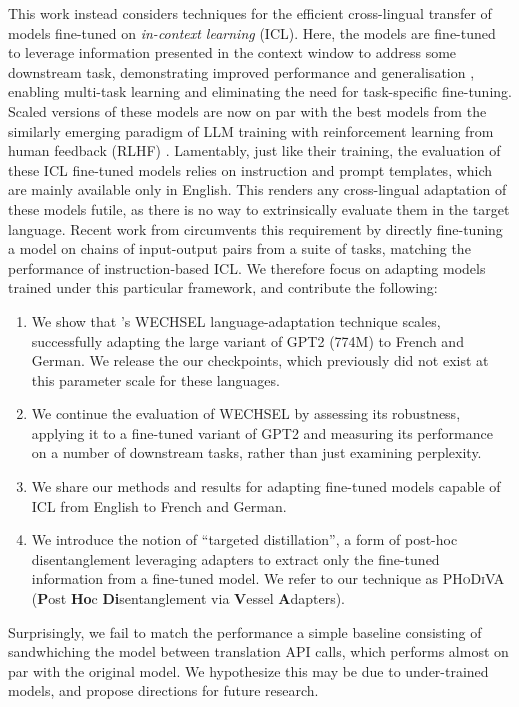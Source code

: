 \documentclass[11pt]{article}
\begin{document}
This work instead considers techniques for the efficient cross-lingual transfer of models fine-tuned
on \textit{in-context learning} (ICL). Here, the models are fine-tuned to leverage information
presented in the context window to address some downstream task, demonstrating improved performance
and generalisation \citep{wei_finetuned_2021,sanh_multitask_2022,wang_benchmarking_2022}, enabling
multi-task learning and eliminating the need for task-specific fine-tuning. Scaled versions of these
models \citep{chung_scaling_2022} are now on par with the best models from the similarly emerging
paradigm of LLM training with reinforcement learning from human feedback (RLHF)
\citep{ouyang_training_2022}. Lamentably, just like their training, the evaluation of these ICL
fine-tuned models relies on instruction and prompt templates, which are mainly available only in
English. This renders any cross-lingual adaptation of these models futile, as there is no way to
extrinsically evaluate them in the target language. Recent work from \citet{min_metaicl_2022}
circumvents this requirement by directly fine-tuning a model on chains of input-output pairs from
a suite of tasks, matching the performance of instruction-based ICL. We therefore focus on adapting
models trained under this particular framework, and contribute the following:
\begin{enumerate}
	\item We show that \citet{minixhofer_wechsel_2022}'s WECHSEL language-adaptation technique scales,
	      successfully adapting the large variant of GPT2 (774M) to French and German. We release the our
	      checkpoints, which previously did not exist at this parameter scale for these languages.
	\item We continue the evaluation of WECHSEL by assessing its robustness, applying it to
	      a fine-tuned variant of GPT2 and measuring its performance on a number of downstream tasks,
	      rather than just examining perplexity.
	\item We share our methods and results for adapting fine-tuned models capable of ICL from English to
	      French and German.
	\item We introduce the notion of ``targeted distillation'', a form of post-hoc disentanglement
	      leveraging adapters \citep{houlsby_parameter-efficient_2019} to extract only the fine-tuned
	      information from a fine-tuned model.  We refer to our technique as \textsc{PHoDiVA}
	      (\textbf{P}ost \textbf{Ho}c \textbf{Di}sentanglement via \textbf{V}essel \textbf{A}dapters).
\end{enumerate}
Surprisingly, we fail to match the performance a simple baseline consisting of sandwhiching the
model between translation API calls, which performs almost on par with the original model. We
hypothesize this may be due to under-trained models, and propose directions for future research.
\end{document}
